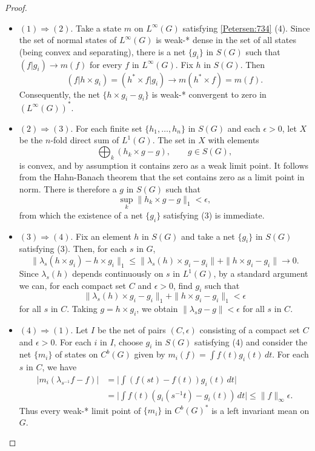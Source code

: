 \documentclass{book}
\begin{document}
\begin{proof}  
  \begin{itemize}
    \item \((1)\Rightarrow(2)\). Take a state \(m\) on \(L^\infty(G)\) satisfying \ref{Petersen:734} (4). Since the set
      of normal states of \(L^\infty(G)\) is weak-* dense in the set of all states (being convex
      and separating), there is a net \(\{g_i\}\) in \(S(G)\) such that \((f|g_i) \rightarrow m(f)\) for every
      \(f\) in \(L^\infty(G)\). Fix \(h\) in \(S(G)\). Then
      \[
        (f|h \times g_i)=(h^* \times f|g_i)\rightarrow m(h^* \times f)=m(f). 
      \]
      Consequently, the net \(\{h\times g_i-g_i\}\) is weak-* convergent to zero in \((L^\infty(G))^*\).
    \item \((2)\Rightarrow(3)\). For each finite set \(\{h_1,\ldots,h_n\}\) in \(S(G)\) and each \(\epsilon>0\), let
      \(X\) be the \(n\)-fold direct sum of \(L^1(G)\). The set in \(X\) with elements
      \[
        \bigoplus_k(h_k\times g-g),\qquad g\in S(G),
      \]
      is convex, and by assumption it contains zero as a weak limit point. It follows from the Hahn-Banach theorem that the set contains zero as a limit point in norm.
      There is therefore a \(g\) in \(S(G)\) such that
      \[
        \sup_k\|h_k\times g-g\|_1<\epsilon,
      \]
      from which the existence of a net \(\{g_i\}\) satisfying (3) is immediate.
    \item \((3)\Rightarrow(4)\). Fix an element \(h\) in \(S(G)\) and take a net \(\{g_i\}\) in \(S(G)\) 
      satisfying (3). Then, for each \(s\) in \(G\),
      \[
        \|\lambda_s(h\times g_i)-h\times g_i\|_1\leq\|\lambda_s(h)\times g_i-g_i\|+\|h\times g_i-g_i\|\rightarrow 0.
      \]
      Since \(\lambda_s(h)\) depends continuously on \(s\) in \(L^1(G)\), by a standard argument we can,
      for each compact set \(C\) and \(\epsilon>0\), find \(g_i\) such that
      \[
        \|\lambda_s(h)\times g_i-g_i\|_1+\|h\times g_i-g_i\|_1<\epsilon
      \]
      for all \(s\) in \(C\). Taking \(g=h\times g_i\), we obtain \(\|\lambda_s g-g\|<\epsilon\) for all \(s\) in \(C\).
    \item \((4)\Rightarrow(1)\). Let \(I\) be the net of pairs \((C,\epsilon)\) consisting of a compact set \(C\)
      and \(\epsilon>0\). For each \(i\) in \(I\), choose \(g_i\) in \(S(G)\) satisfying (4) and consider the net \(\{m_i\}\)
      of states on \(C^b(G)\) given by \(m_i(f)=\int f(t)g_i(t)\,dt\). For each \(s\) in \(C\), we have
      \begin{align*}
        |m_i(\lambda_{s^{-1}}f-f)|&=\vert\int(f(st)-f(t))g_i(t)\,dt\vert\\
        &=\vert\int f(t)(g_i(s^{-1}t)-g_i(t))\,dt\vert\leq\|f\|_\infty\epsilon.
      \end{align*}
      Thus every weak-* limit point of \(\{m_i\}\) in \(C^b(G)^*\) is a left invariant mean on \(G\).
  \end{itemize}
\end{proof}
\end{document}
